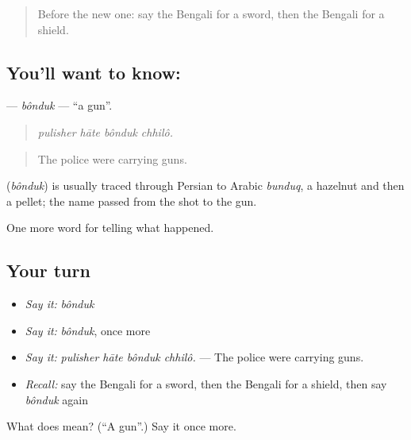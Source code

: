 \begin{quote}
Before the new one: say the Bengali for a sword, then the Bengali for a shield.
\end{quote}

\subsection*{You'll want to know: }
\textbf{} — \emph{bônduk} — \textquotedblleft{}a gun\textquotedblright{}.

\begin{quote}
   
\end{quote}

\begin{quote}
\emph{pulisher hāte bônduk chhilô.}
\end{quote}

\begin{quote}
The police were carrying guns.
\end{quote}

\begin{cousinweb}
\textbf{} (\emph{bônduk}) is usually traced through Persian to Arabic \emph{bunduq}, a hazelnut and then a pellet; the name passed from the shot to the gun.
\end{cousinweb}

\begin{grammarlens}[title={What you've built}]
One more word for telling what happened.
\end{grammarlens}

\subsection*{Your turn}
\begin{itemize}
\raggedright
  \item \emph{Say it:} \emph{bônduk}
  \item \emph{Say it:} \emph{bônduk}, once more
  \item \emph{Say it:} \emph{pulisher hāte bônduk chhilô.} — The police were carrying guns.
  \item \emph{Recall:} say the Bengali for a sword, then the Bengali for a shield, then say \emph{bônduk} again
\end{itemize}

\begin{tcolorbox}[breakable,colback=teal!4,colframe=teal!35!black,title={Before you move on}]
What does  mean? (\textquotedblleft{}A gun\textquotedblright{}.) Say it once more.
\end{tcolorbox}
